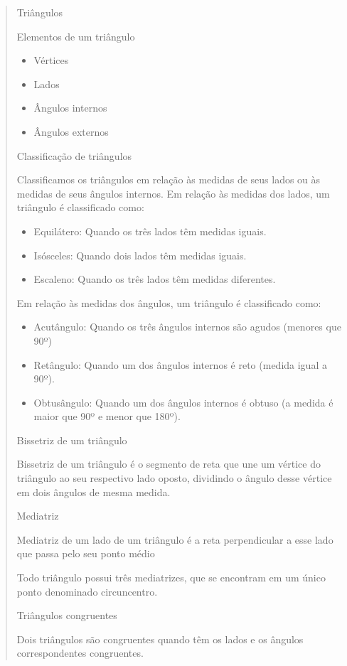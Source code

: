 \begin{quote}
\begin{escolha}
Triângulos

Elementos de um triângulo

\begin{itemize}
\item
  Vértices
\item
  Lados
\item
  Ângulos internos
\item
  Ângulos externos
\end{itemize}

Classificação de triângulos

Classificamos os triângulos em relação às medidas de seus lados ou às
medidas de seus ângulos internos. Em relação às medidas dos lados, um
triângulo é classificado como:

\begin{itemize}
\item
  Equilátero: Quando os três lados têm medidas iguais.
\item
  Isósceles: Quando dois lados têm medidas iguais.
\item
  Escaleno: Quando os três lados têm medidas diferentes.
\end{itemize}

Em relação às medidas dos ângulos, um triângulo é classificado como:

\begin{itemize}
\item
  Acutângulo: Quando os três ângulos internos são agudos (menores que
  90º)
\item
  Retângulo: Quando um dos ângulos internos é reto (medida igual a 90º).
\item
  Obtusângulo: Quando um dos ângulos internos é obtuso (a medida é maior
  que 90º e menor que 180º).
\end{itemize}

Bissetriz de um triângulo

Bissetriz de um triângulo é o segmento de reta que une um vértice do
triângulo ao seu respectivo lado oposto, dividindo o ângulo desse
vértice em dois ângulos de mesma medida.

Mediatriz

Mediatriz de um lado de um triângulo é a reta perpendicular a esse lado
que passa pelo seu ponto médio

Todo triângulo possui três mediatrizes, que se encontram em um único
ponto denominado circuncentro.

Triângulos congruentes

Dois triângulos são congruentes quando têm os lados e os ângulos
correspondentes congruentes.


\end{escolha}
\end{quote}
